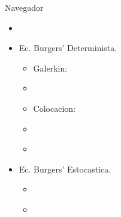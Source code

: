 \label{Navegador}
\begin{frame}{Navegador}
    \begin{itemize}
		\item \hyperlink{Contenido}{}
		\vspace{1mm}
		\item Ec. Burgers' Determinista. 
		\vspace{1mm}
    	\begin{itemize}
    		\item Galerkin: \hyperlink{Figuras-Galerkin}{} \hyperlink{Tablas-Galerkin}{}
		    \vspace{1mm}
		    \item \hyperlink{Proyeccion}{} \hyperlink{Galerkin}{} \hyperlink{Solucion-Galerkin}{}
		    \vspace{1mm}
    		\item Colocacion: \hyperlink{Figuras-Colocacion}{} \hyperlink{Tablas-Galerkin}{}
		    \vspace{1mm}
		    \item \hyperlink{Interpolacion}{} \hyperlink{Colocacion}{} \hyperlink{Solucion-Colocacion}{}
		    \vspace{1mm}
		    \item \hyperlink{Cero-Viscosidad}{} \hyperlink{Figuras-Cero-Viscosidad}{}
		    \vspace{1mm}
    	\end{itemize}
		\vspace{1mm}
		\item Ec. Burgers' Estocastica.
		\begin{itemize}
    		\item \hyperlink{FPK}{} 
		    \vspace{1mm}    
    		\item \hyperlink{Figuras-Estocastica}{} 
    	\end{itemize}
	\end{itemize}
\end{frame}

